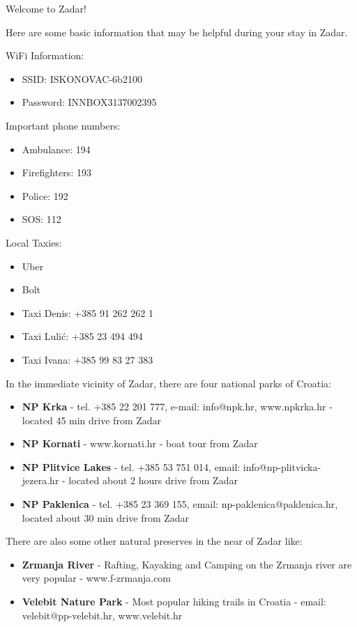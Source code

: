 \documentclass[12pt]{article}
\begin{document}
\begin{center}
\Huge
Welcome to Zadar!
\end{center}
\uwave{\hspace{15cm}}

\large
\vspace{0.5cm}
\noindent
Here are some basic information that may be helpful during your stay in Zadar.


\vspace{0.5cm}
\noindent
WiFi Information:
\begin{itemize}
\item SSID: ISKONOVAC-6b2100
\item Password: INNBOX3137002395
\end{itemize}



\vspace{0.5cm}

\noindent
\large
Important phone numbers:
\begin{itemize}
\large
\item Ambulance: 194
\item Firefighters: 193
\item Police: 192
\item SOS: 112
\end{itemize}

\vspace{0.5cm}
\noindent
\large
Local Taxies:
\begin{itemize}
\large
\item Uber
\item Bolt
\item Taxi Denis: +385 91 262 262 1
\item Taxi Lulić: +385 23 494 494
\item Taxi Ivana: +385 99 83 27 383
\end{itemize}
\newpage
\noindent
In the immediate vicinity of Zadar, there are four national parks of Croatia:
\begin{itemize}
\large
\item \textbf{NP Krka} - tel. +385 22 201 777, e-mail: info@npk.hr, www.npkrka.hr - located 45 min drive from Zadar
\item \textbf{NP Kornati} - www.kornati.hr - boat tour from Zadar
\item \textbf{NP Plitvice Lakes} - tel. +385 53 751 014, email: info@np-plitvicka-jezera.hr - located about 2 hours drive from Zadar
\item \textbf{NP Paklenica} - tel. +385 23 369 155, email: np-paklenica@paklenica.hr,  located about 30 min drive from Zadar 
\end{itemize}
\noindent
There are also some other natural preserves in the near of Zadar like:
\begin{itemize}
\large
\item \textbf{Zrmanja River} - Rafting, Kayaking and Camping on the Zrmanja river are very popular - www.f-zrmanja.com
\item \textbf{Velebit Nature Park} - Most popular hiking trails in Croatia - email: velebit@pp-velebit.hr, www.velebit.hr
\end{itemize}
\end{document}

